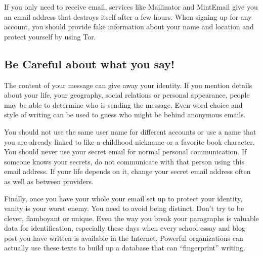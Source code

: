 If you only need to receive email, services like Mailinator and
MintEmail give you an email address that destroys itself after a few
hours. When signing up for any account, you should provide fake
information about your name and location and protect yourself by using
Tor.

\subsection{Be Careful about what you say!}

The content of your message can give away your identity. If you mention
details about your life, your geography, social relations or personal
appearance, people may be able to determine who is sending the message.
Even word choice and style of writing can be used to guess who might be
behind anonymous emails.

You should not use the same user name for different accounts or use a
name that you are already linked to like a childhood nickname or a
favorite book character. You should never use your secret email for
normal personal communication. If someone knows your secrets, do not
communicate with that person using this email address. If your life
depends on it, change your secret email address often as well as between
providers.

Finally, once you have your whole your email set up to protect your
identity, vanity is your worst enemy. You need to avoid being distinct.
Don't try to be clever, flamboyant or unique. Even the way you break
your paragraphs is valuable data for identification, especially these
days when every school essay and blog post you have written is available
in the Internet. Powerful organizations can actually use these texts to
build up a database that can ``fingerprint'' writing.
